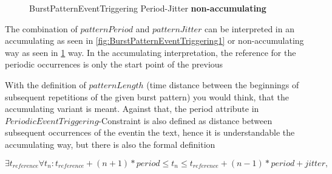 \begin{figure}
	\centering
	\caption{BurstPatternEventTriggering Period-Jitter \textbf{non-accumulating}}
	\label{fig:BurstPatternEventTriggering2}
\end{figure}

The combination of $patternPeriod$ and $patternJitter$ can be interpreted in an accumulating as seen in \ref{fig:BurstPatternEventTriggering1} or non-accumulating way as seen in \ref{fig:BurstPatternEventTriggering2} way. In the accumulating interpretation, the reference for the periodic occurrences is only the start point of the previous 

With the definition of $patternLength$ (\glqq time distance between the beginnings of subsequent repetitions of the given burst pattern\grqq) you would think, that the accumulating variant is meant. Against that, the period attribute in $PeriodicEventTriggering$-Constraint is also defined as \glqq distance between subsequent occurrences of the event\grqq in the text, hence it is understandable the accumulating way, but there is also the formal definition

\begin{math}
	\exists t_{reference}\forall t_n: t_{reference}+(n+1)*period\leq t_n\leq t_{reference}+(n-1)*period+jitter,
\end{math}

